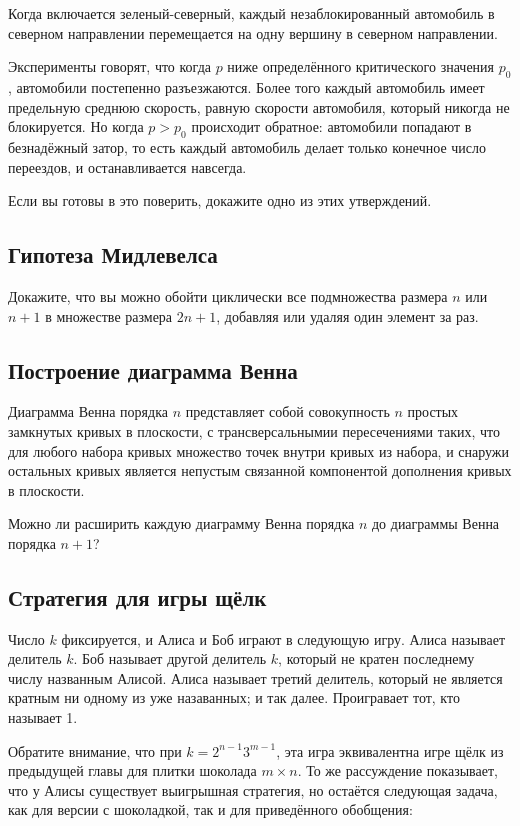 Когда включается зеленый-северный, каждый незаблокированный автомобиль в северном направлении перемещается на одну вершину в северном направлении.

Эксперименты говорят, что когда $p$ ниже определённого критического значения $p_0$,
автомобили постепенно разъезжаются.
Более того каждый автомобиль имеет предельную среднюю скорость, равную скорости автомобиля, который никогда не блокируется.
Но когда $p> p_0$ происходит обратное: автомобили попадают в безнадёжный затор, то есть каждый автомобиль делает только конечное число переездов, и останавливается навсегда.

Если вы готовы в это поверить, докажите одно из этих утверждений.

\subsection*{Гипотеза Мидлевелса}

Докажите, что вы можно обойти циклически все подмножества размера $n$ или $n+1$ в множестве размера $2n+1$, добавляя или удаляя один элемент за раз.

\subsection*{Построение диаграмма Венна}

Диаграмма Венна порядка $n$ представляет собой совокупность $n$ простых замкнутых кривых в плоскости, с трансверсальнымии пересечениями таких, что для любого набора кривых множество точек внутри кривых из набора, и снаружи остальных кривых является непустым связанной компонентой дополнения кривых в плоскости.

Можно ли расширить каждую диаграмму Венна  порядка $n$ до диаграммы Венна порядка $n+1$?

\subsection*{Стратегия для игры щёлк}

Число $k$ фиксируется, и Алиса и Боб играют в следующую игру.
Алиса называет делитель $k$.
Боб называет другой делитель $k$, который не кратен последнему числу названным Алисой.
Алиса называет третий делитель, который не является кратным ни одному из уже назаванных; 
и так далее.
Проигравает тот, кто называет 1.

Обратите внимание, что при $k=2^{n-1}3^{m-1}$, эта игра эквивалентна игре щёлк из предыдущей главы для плитки шоколада $m\times n$.
То же рассуждение показывает, что у Алисы существует выигрышная стратегия, но остаётся следующая задача, как для версии с шоколадкой, так и для приведённого обобщения:

